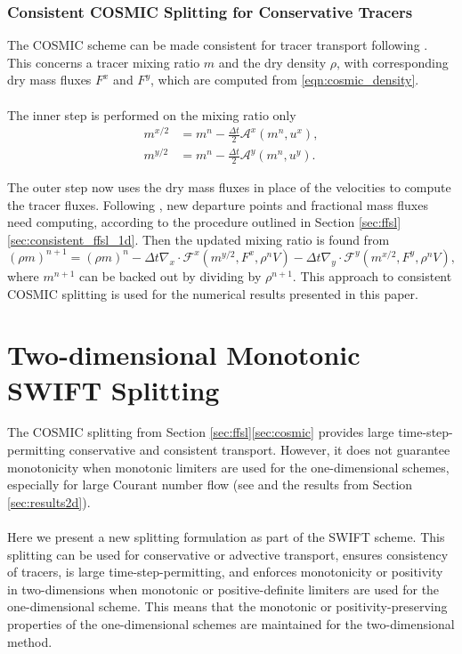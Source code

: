 \documentclass{ametsocV6.1}
\begin{document}
\subsubsection{Consistent COSMIC Splitting for Conservative Tracers} \label{sec:cosmic_tracer}
The COSMIC scheme can be made consistent for tracer transport following \cite{lin1996ffsl}.
This concerns a tracer mixing ratio $m$ and the dry density $\rho$, with corresponding dry mass fluxes $F^x$ and $F^y$, which are computed from \eqref{eqn:cosmic_density}. \\ 
\\
The inner step is performed on the mixing ratio only
\begin{subequations}
\begin{align}
    m^{x/2} &= m^n - \frac{\Delta{t}}{2} \mathcal{A}^x(m^n, u^x), \\
    m^{y/2} &= m^n - \frac{\Delta{t}}{2} \mathcal{A}^y(m^n, u^y).
\end{align}
\end{subequations}

The outer step now uses the dry mass fluxes in place of the velocities to compute the tracer fluxes.
Following \citet{skamarock2006limiters}, new departure points and fractional mass fluxes need computing, according to the procedure outlined in Section \ref{sec:ffsl}\ref{sec:consistent_ffsl_1d}.
Then the updated mixing ratio is found from
\begin{equation} \label{eqn:cosmic_tracer_end}
   (\rho m)^{n+1} = (\rho m)^{n} - \Delta{t} \nabla_x\cdot \mathcal{F}^x(m^{y/2},F^x,\rho^nV) - \Delta{t} \nabla_y\cdot \mathcal{F}^y(m^{x/2},F^y,\rho^nV),
\end{equation}
where $m^{n+1}$ can be backed out by dividing by $\rho^{n+1}$. This approach to consistent COSMIC splitting is used for the numerical results presented in this paper. 


\section{Two-dimensional Monotonic SWIFT Splitting} \label{sec:swift_splitting} 

The COSMIC splitting from Section \ref{sec:ffsl}\ref{sec:cosmic} provides large time-step-permitting conservative and consistent transport. However, it does not guarantee monotonicity when monotonic limiters are used for the one-dimensional schemes, especially for large Courant number flow (see \citep{leonard1996cosmic,lin1996ffsl,bott2010improving} and the results from Section \ref{sec:results2d}). \\
\\
Here we present a new splitting formulation as part of the SWIFT scheme. This splitting can be used for conservative or advective transport, ensures consistency of tracers, is large time-step-permitting, and enforces monotonicity or positivity in two-dimensions when monotonic or positive-definite limiters are used for the one-dimensional scheme. This means that the monotonic or positivity-preserving properties of the one-dimensional schemes are maintained for the two-dimensional method. 
\end{document}
